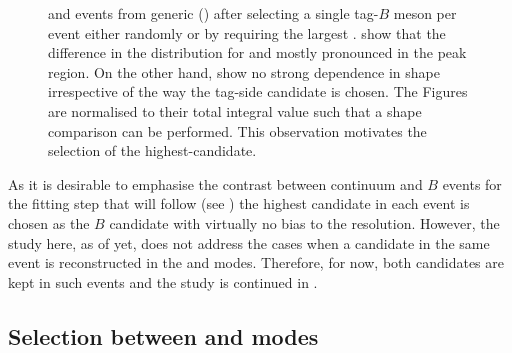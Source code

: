 \begin{figure}[htbp!]
{    and \mbox{\epem\ra\qqbar} events from generic \MC () after selecting a single tag-$B$ meson per event either randomly or by requiring the largest \feiProb.
     show that the difference in the \Mbc distribution for \BptoXsgamma and \BztoXsgamma mostly pronounced in the peak region.
    On the other hand,  show no strong dependence in shape irrespective of the way the tag-side candidate is chosen.
    The Figures are normalised to their total integral value such that a shape comparison can be performed.
    This observation motivates the selection of the highest-\feiProb candidate.
    }    
\end{figure}

As it is desirable to emphasise the contrast between continuum and $B$ events for the fitting step that will follow (see )
the highest \feiProb candidate in each event is chosen as the $B$ candidate with virtually no bias to the resolution.
However, the study here, as of yet, does not address the cases when a candidate in the same event is reconstructed in the \feiBp and \feiBz modes.
Therefore, for now, both candidates are kept in such events and the study is continued in .

\subsection{Selection between \texorpdfstring{\feiBp}{feiB+} and \texorpdfstring{\feiBz}{feiB0} modes}\label{sec:select_best_candidate}

